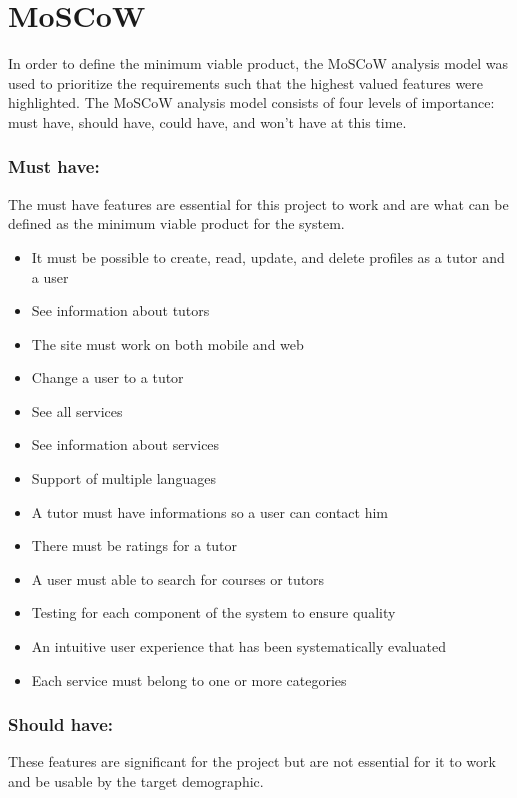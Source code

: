 \section{MoSCoW}
In order to define the minimum viable product, the MoSCoW analysis model was used to prioritize the requirements such that the highest valued features were highlighted.
The MoSCoW analysis model consists of four levels of importance: must have, should have, could have, and won't have at this time.

\subsubsection{Must have:}
The must have features are essential for this project to work and are what can be defined as the minimum viable product for the system.

\begin{itemize}
    \item It must be possible to create, read, update, and delete profiles as a tutor and a user
    \item See information about tutors
    \item The site must work on both mobile and web
    \item Change a user to a tutor
    \item See all services
    \item See information about services
    \item Support of multiple languages
    \item A tutor must have informations so a user can contact him
    \item There must be ratings for a tutor
    \item A user must able to search for courses or tutors
    \item Testing for each component of the system to ensure quality
    \item An intuitive user experience that has been systematically evaluated 
    \item Each service must belong to one or more categories
\end{itemize}

\subsubsection{Should have:}
These features are significant for the project but are not essential for it to work and be usable by the target demographic.


